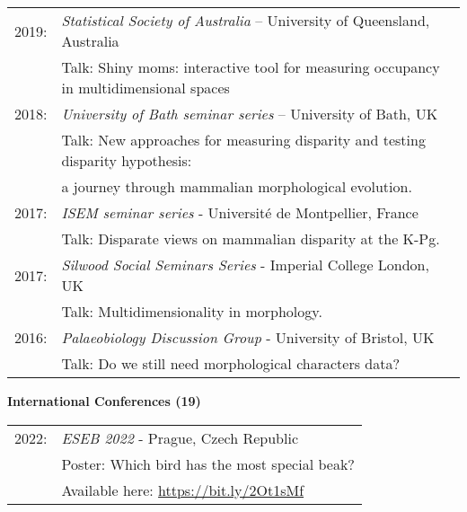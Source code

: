 \documentclass[10pt,a4paper]{article}
\begin{document}
{\begin{tabular}{ll}
2019: & \textit{Statistical Society of Australia} – University of Queensland, Australia\\
      & Talk: Shiny moms: interactive tool for measuring occupancy in multidimensional spaces\\
2018: & \textit{University of Bath seminar series} – University of Bath, UK\\
      & Talk: New approaches for measuring disparity and testing disparity hypothesis:\\
      & a journey through mammalian morphological evolution.\\
2017: & \textit{ISEM seminar series} - Universit\'{e} de Montpellier, France\\
      & Talk: Disparate views on mammalian disparity at the K-Pg.\\ 
2017: & \textit{Silwood Social Seminars Series} - Imperial College London, UK\\
      & Talk: Multidimensionality in morphology.\\ 
2016: & \textit{Palaeobiology Discussion Group} - University of Bristol, UK\\
      & Talk: Do we still need morphological characters data?\\ 
\end{tabular}

\bigskip

\raggedright\textbf{International Conferences (19)}\\[1.5ex]


\begin{tabular}{ll}
2022: & \textit{ESEB 2022} - Prague, Czech Republic\\
      & Poster: Which bird has the most special beak?\\
      & Available here: \href{https://figshare.com/articles/Shifting_spaces_which_disparity_or_dissimilarity_metrics_best_summarise_occupancy_in_multidimensional_spaces_/9922961}{https://bit.ly/2Ot1sMf}\\
\end{tabular}

}
\end{document}
